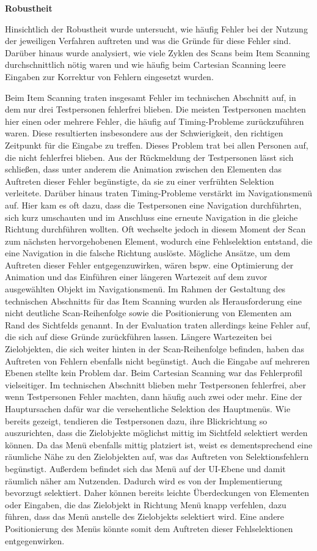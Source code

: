 \textbf{Robustheit}

Hinsichtlich der Robustheit wurde untersucht, wie häufig Fehler bei der Nutzung der jeweiligen Verfahren auftreten und was die Gründe für diese Fehler sind. Darüber hinaus wurde analysiert, wie viele Zyklen des Scans beim Item Scanning durchschnittlich nötig waren und wie häufig beim Cartesian Scanning leere Eingaben zur Korrektur von Fehlern eingesetzt wurden. 

Beim Item Scanning traten insgesamt Fehler im technischen Abschnitt auf, in dem nur drei Testpersonen fehlerfrei blieben. Die meisten Testpersonen machten hier einen oder mehrere Fehler, die häufig auf Timing-Probleme zurückzuführen waren. Diese resultierten insbesondere aus der Schwierigkeit, den richtigen Zeitpunkt für die Eingabe zu treffen. Dieses Problem trat bei allen Personen auf, die nicht fehlerfrei blieben. Aus der Rückmeldung der Testpersonen lässt sich schließen, dass unter anderem die Animation zwischen den Elementen das Auftreten dieser Fehler begünstigte, da sie zu einer verfrühten Selektion verleitete. Darüber hinaus traten Timing-Probleme verstärkt im Navigationsmenü auf.  Hier kam es oft dazu, dass die Testpersonen eine Navigation durchführten, sich kurz umschauten und im Anschluss eine erneute Navigation in die gleiche Richtung durchführen wollten. Oft wechselte jedoch in diesem Moment der Scan zum nächsten hervorgehobenen Element, wodurch eine Fehlselektion entstand, die eine Navigation in die falsche Richtung auslöste. Mögliche Ansätze, um dem Auftreten dieser Fehler entgegenzuwirken, wären bspw. eine Optimierung der Animation und das Einführen einer längeren Wartezeit auf dem zuvor ausgewählten Objekt im Navigationsmenü. 
Im Rahmen der Gestaltung des technischen Abschnitts für das Item Scanning wurden als Herausforderung eine nicht deutliche Scan-Reihenfolge sowie die Positionierung von Elementen am Rand des Sichtfelds genannt. In der Evaluation traten allerdings keine Fehler auf, die sich auf diese Gründe zurückführen lassen. Längere Wartezeiten bei Zielobjekten, die sich weiter hinten in der Scan-Reihenfolge befinden, haben das Auftreten von Fehlern ebenfalls nicht begünstigt. Auch die Eingabe auf mehreren Ebenen stellte kein Problem dar. 
Beim Cartesian Scanning war das Fehlerprofil vielseitiger. Im technischen Abschnitt blieben mehr Testpersonen fehlerfrei, aber wenn Testpersonen Fehler machten, dann häufig auch zwei oder mehr. Eine der Hauptursachen dafür war die versehentliche Selektion des Hauptmenüs. Wie bereits gezeigt, tendieren die Testpersonen dazu, ihre Blickrichtung so auszurichten, dass die Zielobjekte möglichst mittig im Sichtfeld selektiert werden können. Da das Menü ebenfalls mittig platziert ist, weist es dementsprechend eine räumliche Nähe zu den Zielobjekten auf, was das Auftreten von Selektionsfehlern begünstigt. Außerdem befindet sich das Menü auf der UI-Ebene und damit räumlich näher am Nutzenden. Dadurch wird es von der Implementierung bevorzugt selektiert. Daher können bereits leichte Überdeckungen von Elementen oder Eingaben, die das Zielobjekt in Richtung Menü knapp verfehlen, dazu führen, dass das Menü anstelle des Zielobjekts selektiert wird. Eine andere Positionierung des Menüs könnte somit dem Auftreten dieser Fehlselektionen entgegenwirken. 
